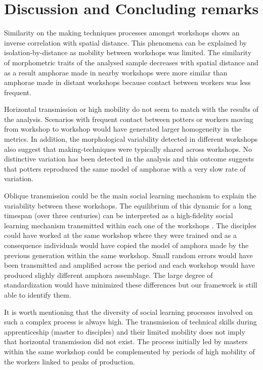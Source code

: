 \documentclass[review]{elsarticle}
\begin{document}
\section{Discussion and Concluding remarks}

Similarity on the making techniques processes amongst workshops shows an inverse correlation with spatial distance. This phenomena can be explained by isolation-by-distance as mobility between workshops was limited. The similarity of morphometric traits of the analysed sample decreases with spatial distance and as a result amphorae made in nearby workshops were more similar than amphorae made in distant workshops because contact between workers was less frequent. 

Horizontal transmission or high mobility do not seem to match with the results of the analysis. Scenarios with frequent contact between potters or workers moving from workshop to workshop would have generated larger homogeneity in the metrics. In addition, the morphological variability detected in different workshops also suggest that making-techniques were typically shared across workshops. No distinctive variation has been detected in the analysis and this outcome suggests that potters reproduced the same model of amphorae with a very slow rate of variation.
  

Oblique transmission could be the main social learning mechanism to explain the variability between these workshops. The equilibrium of this dynamic for a long timespan (over three centuries) can be interpreted as a high-fidelity social learning mechanism transmitted within each one of the workshops \citep{schillinger_copying_2016}. The disciples could have worked at the same workshop where they were trained and as a consequence individuals would have copied the model of amphora made by the previous generation within the same workshop. Small random errors would have been transmitted and amplified across the period and each workshop would have produced slighly different amphora assemblage. The large degree of standardization would have minimized these differences but our framework is still able to identify them.

It is worth mentioning that the diversity of social learning processes involved on such a complex process is always high. The transmission of technical skills during apprenticeship (master to disciples) and their limited mobility does not imply that horizontal transmission did not exist. The process initially led by masters within the same workshop could be complemented by periods of high mobility of the workers linked to peaks of production.
\end{document}
